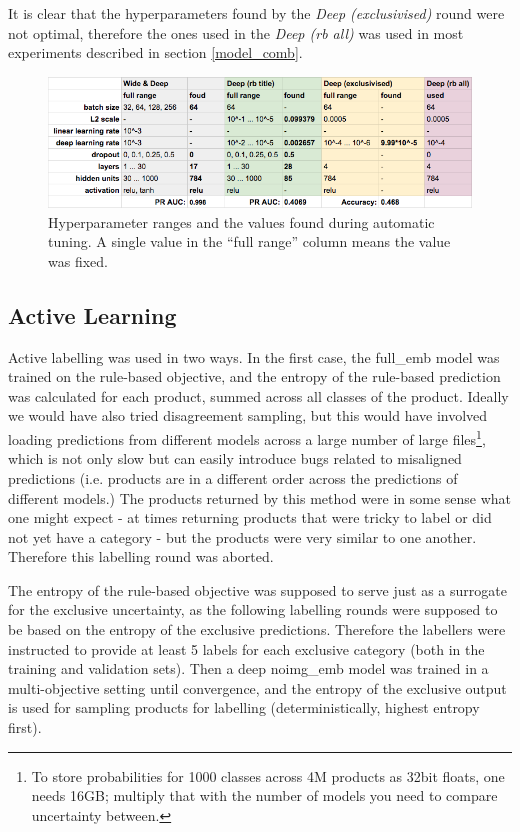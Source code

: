 It is clear that the hyperparameters found by the \textit{Deep (exclusivised)} round were not optimal, therefore the ones used in the \textit{Deep (rb all)} was used in most experiments described in section \ref{model_comb}.

\begin{figure}
  \includegraphics[width=\linewidth]{figures/tuning_rounds}
  \caption{Hyperparameter ranges and the values found during automatic tuning. A single value in the ``full range'' column means the value was fixed.}
  \label{tuning_rounds}
\end{figure}

\subsection{Active Learning}
\label{exp_al}

Active labelling was used in two ways.
In the first case, the full\_emb model was trained on the rule-based objective, and the entropy of the rule-based prediction was calculated for each product, summed across all classes of the product.
Ideally we would have also tried disagreement sampling, but this would have involved loading predictions from different models across a large number of large files\footnote{To store probabilities for 1000 classes across 4M products as 32bit floats, one needs 16GB; multiply that with the number of models you need to compare uncertainty between.}, which is not only slow but can easily introduce bugs related to misaligned predictions (i.e. products are in a different order across the predictions of different models.)
The products returned by this method were in some sense what one might expect - at times returning products that were tricky to label or did not yet have a category - but the products were very similar to one another. Therefore this labelling round was aborted.

The entropy of the rule-based objective was supposed to serve just as a surrogate for the exclusive uncertainty, as the following labelling rounds were supposed to be based on the entropy of the exclusive predictions.
Therefore the labellers were instructed to provide at least 5 labels for each exclusive category (both in the training and validation sets).
Then a deep noimg\_emb model was trained in a multi-objective setting until convergence, and the entropy of the exclusive output is used for sampling products for labelling (deterministically, highest entropy first).

